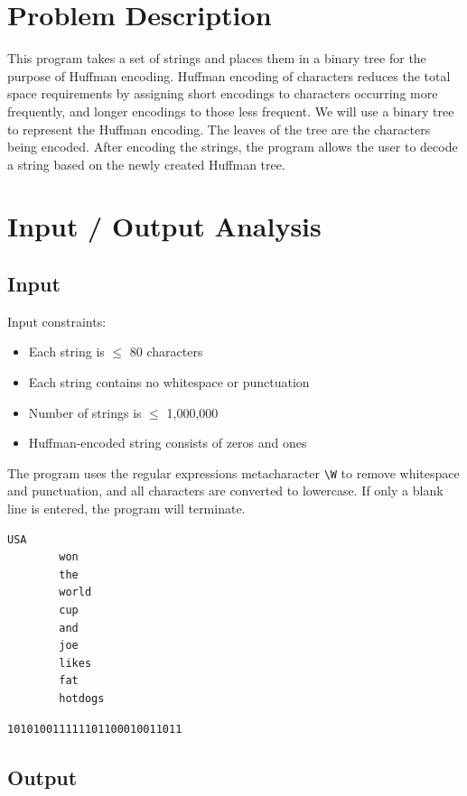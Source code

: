 

	
	
	\section{Problem Description}
	This program takes a set of strings and places them in a binary tree for the purpose of Huffman encoding. Huffman encoding of characters reduces the total space requirements by assigning short encodings to characters occurring more frequently, and longer encodings to those less frequent. We will use a binary tree to represent the Huffman encoding. The leaves of the tree are the characters being encoded. After encoding the strings, the program allows the user to decode a string based on the newly created Huffman tree.
	
	\section{Input / Output Analysis}
	\subsection{Input}
	Input constraints:
	\begin{itemize}
		\item Each string is $\leq$ 80 characters
		\item Each string contains no whitespace or punctuation
		\item Number of strings is $\leq$ 1,000,000
		\item Huffman-encoded string consists of zeros and ones
	\end{itemize}
	The program uses the regular expressions metacharacter \verb|\W| to remove whitespace and punctuation, and all characters are converted to lowercase. If only a blank line is entered, the program will terminate.
	\begin{lstlisting}[caption=Sample plaintext input]
		USA
		won
		the
		world
		cup
		and
		joe
		likes
		fat
		hotdogs
	\end{lstlisting}
	\vspace{1cm}
	\begin{lstlisting}[caption=Sample encoded input]
		101010011111101100010011011
	\end{lstlisting}
	\newpage
	
	\subsection{Output}
	

